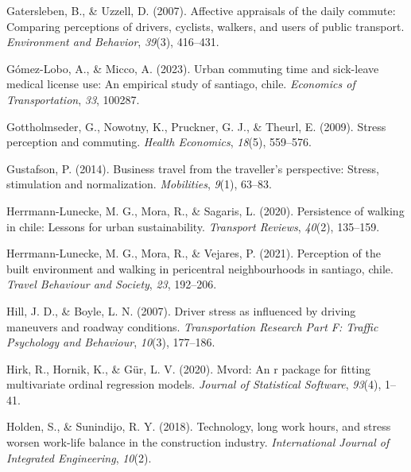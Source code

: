 \documentclass[
11pt, %
oneside, %
english, %
singlespacing, %
]{macthesis} %
\newlength{\cslhangindent}
\newenvironment{CSLReferences}[2] %
 {%
  \setlength{\parindent}{0pt}
  \ifodd #1 \everypar{\setlength{\hangindent}{\cslhangindent}}\ignorespaces\fi
  \ifnum #2 > 0
  \setlength{\parskip}{#2\baselineskip}
  \fi
 }%
 {}
\begin{document}
\begin{CSLReferences}{1}{0}
\leavevmode{}%
Gatersleben, B., \& Uzzell, D. (2007). Affective appraisals of the daily commute: Comparing perceptions of drivers, cyclists, walkers, and users of public transport. \emph{Environment and Behavior}, \emph{39}(3), 416--431.

\leavevmode{}%
Gómez-Lobo, A., \& Micco, A. (2023). Urban commuting time and sick-leave medical license use: An empirical study of santiago, chile. \emph{Economics of Transportation}, \emph{33}, 100287.

\leavevmode{}%
Gottholmseder, G., Nowotny, K., Pruckner, G. J., \& Theurl, E. (2009). Stress perception and commuting. \emph{Health Economics}, \emph{18}(5), 559--576.

\leavevmode{}%
Gustafson, P. (2014). Business travel from the traveller's perspective: Stress, stimulation and normalization. \emph{Mobilities}, \emph{9}(1), 63--83.

\leavevmode{}%
Herrmann-Lunecke, M. G., Mora, R., \& Sagaris, L. (2020). Persistence of walking in chile: Lessons for urban sustainability. \emph{Transport Reviews}, \emph{40}(2), 135--159.

\leavevmode{}%
Herrmann-Lunecke, M. G., Mora, R., \& Vejares, P. (2021). Perception of the built environment and walking in pericentral neighbourhoods in santiago, chile. \emph{Travel Behaviour and Society}, \emph{23}, 192--206.

\leavevmode{}%
Hill, J. D., \& Boyle, L. N. (2007). Driver stress as influenced by driving maneuvers and roadway conditions. \emph{Transportation Research Part F: Traffic Psychology and Behaviour}, \emph{10}(3), 177--186.

\leavevmode{}%
Hirk, R., Hornik, K., \& Gür, L. V. (2020). Mvord: An r package for fitting multivariate ordinal regression models. \emph{Journal of Statistical Software}, \emph{93}(4), 1--41.

\leavevmode{}%
Holden, S., \& Sunindijo, R. Y. (2018). Technology, long work hours, and stress worsen work-life balance in the construction industry. \emph{International Journal of Integrated Engineering}, \emph{10}(2).


\end{CSLReferences}
\end{document}
